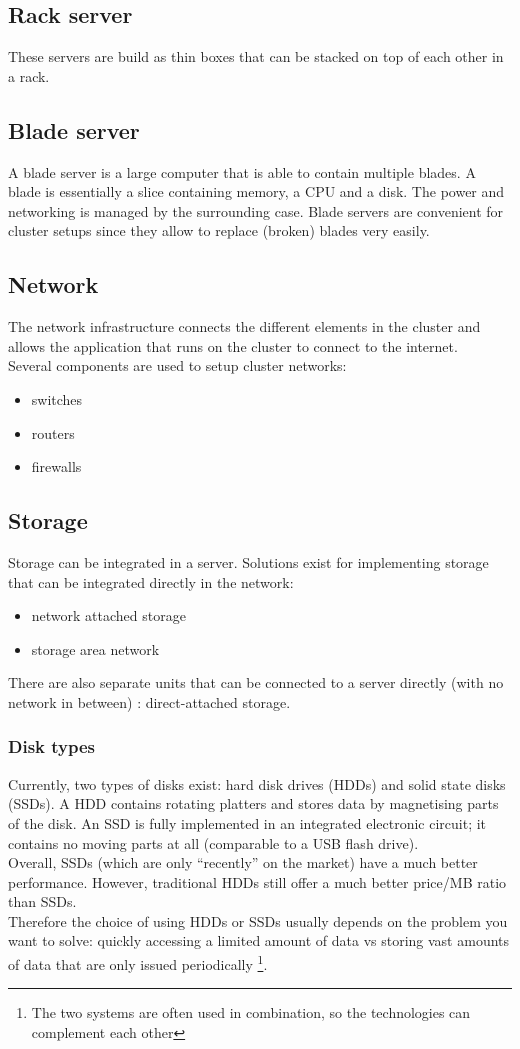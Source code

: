 \documentclass[12pt]{report}
\begin{document}
\subsection{Rack server}
These servers are build as thin boxes that can be stacked on top of each other in a rack.
\subsection{Blade server}
A blade server is a large computer that is able to contain multiple
  blades. A blade is essentially a slice containing memory, a CPU and a
  disk. The power and networking is managed by the surrounding case.
 Blade servers are convenient for cluster setups since they
   allow to replace (broken) blades very easily.
\subsection{Network}
The network infrastructure connects the different elements in the
cluster and allows the application
that runs on the cluster to connect to the internet.\\
Several components are used to setup cluster networks:
\begin{itemize}
\item switches
\item routers
\item firewalls
\end{itemize}
\subsection{Storage}
Storage can be integrated in a server. Solutions exist for implementing storage that can be 
integrated directly in the network:
\begin{itemize}
\item network attached storage 
\item storage area network
\end{itemize}
There are also separate units that can be connected to a server
directly (with no network in between) : direct-attached storage.
\subsubsection{Disk types}
Currently, two types of disks exist: hard disk drives (HDDs) and
solid state disks (SSDs). A HDD contains rotating platters and 
stores data by magnetising parts of the disk. An SSD is fully
implemented in an integrated electronic circuit; it contains no moving
parts at all (comparable to a USB flash drive).\\
Overall, SSDs (which are only ``recently'' on the market) have a much better
performance. However, traditional HDDs still offer a much better
price/MB ratio than SSDs.\\
Therefore the choice of using HDDs or SSDs usually depends on the
problem you want to solve: quickly accessing a limited amount of data
vs storing vast amounts of data that are only issued
periodically \footnote{The two systems are often used in combination,
so the technologies can complement each other}.
\end{document}
